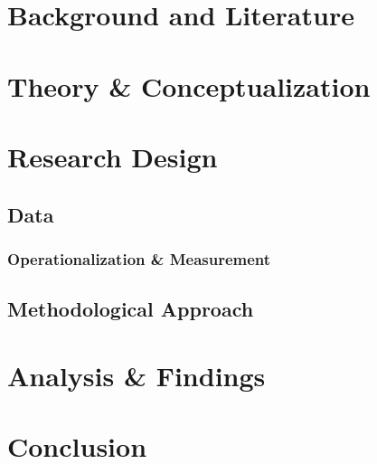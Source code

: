 \documentclass[
  12pt,
]{article}
\begin{document}
\hypertarget{background-and-literature}{%
\section*{Background and Literature}\label{background-and-literature}}

\hypertarget{theory-conceptualization}{%
\section*{Theory \& Conceptualization}\label{theory-conceptualization}}

\hypertarget{research-design}{%
\section*{Research Design}\label{research-design}}

\hypertarget{data}{%
\subsection*{Data}\label{data}}

\hypertarget{operationalization-measurement}{%
\subsubsection*{Operationalization \& Measurement}\label{operationalization-measurement}}

\hypertarget{methodological-approach}{%
\subsection*{Methodological Approach}\label{methodological-approach}}

\hypertarget{analysis-findings}{%
\section*{Analysis \& Findings}\label{analysis-findings}}

\hypertarget{conclusion}{%
\section*{Conclusion}\label{conclusion}}
\end{document}
